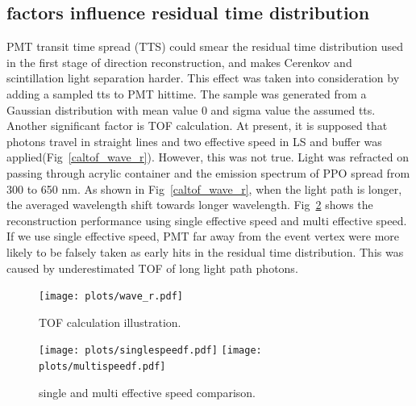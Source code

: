 \documentclass[a4paper,10pt]{cpc-hepnp}
\begin{document}
\subsection{factors influence residual time distribution}
PMT transit time spread (TTS) could smear the residual time distribution used
in the first stage of direction reconstruction, and makes Cerenkov and
scintillation light separation harder. This effect was taken into
consideration by adding a sampled tts to PMT hittime. The sample was generated
from a Gaussian distribution with mean value 0 and sigma value the assumed
tts. Another significant factor is TOF calculation. At present, it is supposed
that photons travel in straight lines and two effective speed in LS and buffer
was applied(Fig~\ref{caltof_wave_r}). However, this was not true. Light was
refracted on passing through acrylic container and the emission spectrum of PPO
spread from 300 to 650 nm. As shown in Fig~\ref{caltof_wave_r}, 
when the light path is longer, the averaged wavelength shift towards
longer wavelength. Fig~\ref{tof_cor} shows the reconstruction performance
using single effective speed and multi effective speed. If we use single
effective speed, PMT far away from the event vertex were more likely to be falsely
taken as early hits in the residual time distribution. This was caused by
underestimated TOF of long light path photons.
\begin{figure}[htbp]
\centering %
\texttt{[image: plots/wave\_r.pdf]}
\caption{\label{xzcomp} TOF calculation illustration.}
\end{figure}

\begin{figure}[htbp]
\centering %
\texttt{[image: plots/singlespeedf.pdf]}
\hfill
\texttt{[image: plots/multispeedf.pdf]}
\caption{\label{tof_cor} single and multi effective speed comparison.}
\end{figure}

\end{document}

